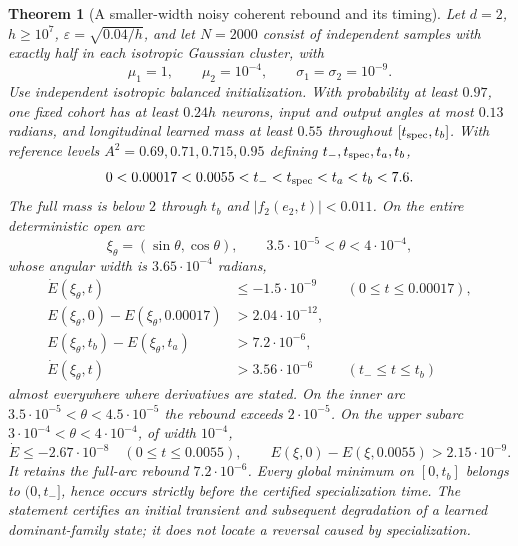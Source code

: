 \documentclass{article} %
\theoremstyle{plain}
\newtheorem{theorem}{Theorem}[section]
\theoremstyle{definition}
\theoremstyle{remark}
\begin{document}
\begin{theorem}[A smaller-width noisy coherent rebound and its timing]
\label{sbsharp:theorem}
Let $d=2$, $h\ge10^7$, $\varepsilon=\sqrt{0.04/h}$, and let $N=2000$
consist of independent samples with exactly half in each isotropic
Gaussian cluster, with
\[
 \mu_1=1,\qquad\mu_2=10^{-4},\qquad\sigma_1=\sigma_2=10^{-9}.
\]
Use independent isotropic balanced initialization. With probability at
least $0.97$, one fixed cohort has at least $0.24h$ neurons, input and
output angles at most $0.13$ radians, and longitudinal learned mass at
least $0.55$ throughout $[t_{\rm spec},t_b]$. With reference levels
$A^2=0.69,0.71,0.715,0.95$ defining $t_-,t_{\rm spec},t_a,t_b$,
\[
 0<0.00017<0.0055<t_-<t_{\rm spec}<t_a<t_b<7.6.
\]
The full mass is below $2$ through $t_b$ and $|f_2(e_2,t)|<0.011$.
On the entire deterministic open arc
\[
 \xi_\theta=(\sin\theta,\cos\theta),\qquad
 3.5\cdot10^{-5}<\theta<4\cdot10^{-4},
\]
whose angular width is $3.65\cdot10^{-4}$ radians,
\begin{align*}
 \dot E(\xi_\theta,t)&\le-1.5\cdot10^{-9}
                         &&(0\le t\le0.00017),\\
 E(\xi_\theta,0)-E(\xi_\theta,0.00017)&>2.04\cdot10^{-12},\\
 E(\xi_\theta,t_b)-E(\xi_\theta,t_a)&>7.2\cdot10^{-6},\\
 \dot E(\xi_\theta,t)&>3.56\cdot10^{-6}
                         &&(t_-\le t\le t_b)
\end{align*}
almost everywhere where derivatives are stated. On the inner arc
$3.5\cdot10^{-5}<\theta<4.5\cdot10^{-5}$ the rebound exceeds
$2\cdot10^{-5}$. On the upper subarc
$3\cdot10^{-4}<\theta<4\cdot10^{-4}$, of width $10^{-4}$,
\[
 \dot E\le-2.67\cdot10^{-8}\quad(0\le t\le0.0055),\qquad
 E(\xi,0)-E(\xi,0.0055)>2.15\cdot10^{-9}.
\]
It retains the full-arc rebound $7.2\cdot10^{-6}$.
Every global minimum
on $[0,t_b]$ belongs to $(0,t_-]$, hence occurs strictly before the
certified specialization time. The statement certifies an initial
transient and subsequent degradation of a learned dominant-family state;
it does not locate a reversal caused by specialization.
\end{theorem}
\end{document}

